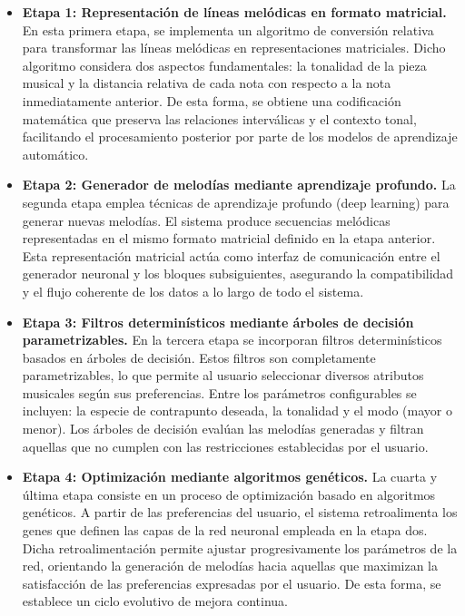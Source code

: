 \documentclass[12pt]{report}
\begin{document}
\begin{itemize}
    \item \textbf{Etapa 1: Representación de líneas melódicas en formato matricial.} 
    En esta primera etapa, se implementa un algoritmo de conversión relativa para transformar las líneas melódicas en representaciones matriciales. Dicho algoritmo considera dos aspectos fundamentales: la tonalidad de la pieza musical y la distancia relativa de cada nota con respecto a la nota inmediatamente anterior. De esta forma, se obtiene una codificación matemática que preserva las relaciones interválicas y el contexto tonal, facilitando el procesamiento posterior por parte de los modelos de aprendizaje automático.
    
    \item \textbf{Etapa 2: Generador de melodías mediante aprendizaje profundo.} 
    La segunda etapa emplea técnicas de aprendizaje profundo (deep learning) para generar nuevas melodías. El sistema produce secuencias melódicas representadas en el mismo formato matricial definido en la etapa anterior. Esta representación matricial actúa como interfaz de comunicación entre el generador neuronal y los bloques subsiguientes, asegurando la compatibilidad y el flujo coherente de los datos a lo largo de todo el sistema.
    
    \item \textbf{Etapa 3: Filtros determinísticos mediante árboles de decisión parametrizables.} 
    En la tercera etapa se incorporan filtros determinísticos basados en árboles de decisión. Estos filtros son completamente parametrizables, lo que permite al usuario seleccionar diversos atributos musicales según sus preferencias. Entre los parámetros configurables se incluyen: la especie de contrapunto deseada, la tonalidad y el modo (mayor o menor). Los árboles de decisión evalúan las melodías generadas y filtran aquellas que no cumplen con las restricciones establecidas por el usuario.
    
    \item \textbf{Etapa 4: Optimización mediante algoritmos genéticos.} 
    La cuarta y última etapa consiste en un proceso de optimización basado en algoritmos genéticos. A partir de las preferencias del usuario, el sistema retroalimenta los genes que definen las capas de la red neuronal empleada en la etapa dos. Dicha retroalimentación permite ajustar progresivamente los parámetros de la red, orientando la generación de melodías hacia aquellas que maximizan la satisfacción de las preferencias expresadas por el usuario. De esta forma, se establece un ciclo evolutivo de mejora continua.
\end{itemize}
\end{document}
